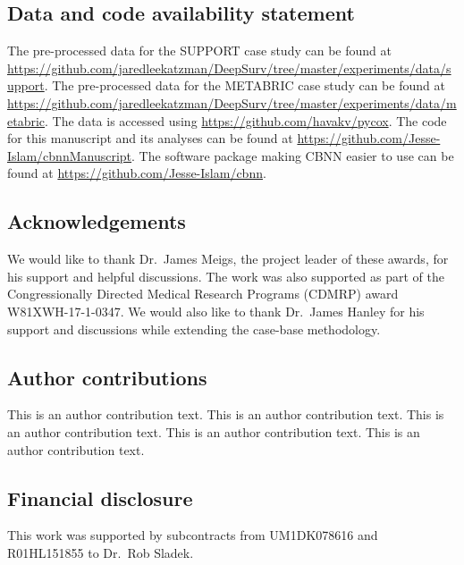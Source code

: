 \documentclass[APA,LATO1COL]{WileyNJD-v2}
\begin{document}

\hypertarget{data-and-code-availability-statement}{%
\subsection*{Data and code availability
statement}\label{data-and-code-availability-statement}}

The pre-processed data for the SUPPORT case study can be found at
\url{https://github.com/jaredleekatzman/DeepSurv/tree/master/experiments/data/support}.
The pre-processed data for the METABRIC case study can be found at
\url{https://github.com/jaredleekatzman/DeepSurv/tree/master/experiments/data/metabric}.
The data is accessed using \url{https://github.com/havakv/pycox}. The
code for this manuscript and its analyses can be found at
\url{https://github.com/Jesse-Islam/cbnnManuscript}. The software
package making CBNN easier to use can be found at
\url{https://github.com/Jesse-Islam/cbnn}.

\hypertarget{acknowledgements}{%
\subsection*{Acknowledgements}\label{acknowledgements}}

We would like to thank Dr.~James Meigs, the project
leader of these awards, for his support and helpful discussions. The
work was also supported as part of the Congressionally Directed Medical
Research Programs (CDMRP) award W81XWH-17-1-0347. We would also like to
thank Dr.~James Hanley for his support and discussions while extending
the case-base methodology.

\subsection*{Author contributions}

This is an author contribution text. This is an author contribution text. This is an author contribution text. This is an author contribution text. This is an author contribution text.

\subsection*{Financial disclosure}

This work was supported by subcontracts from UM1DK078616 and R01HL151855
to Dr.~Rob Sladek. 
\end{document}
